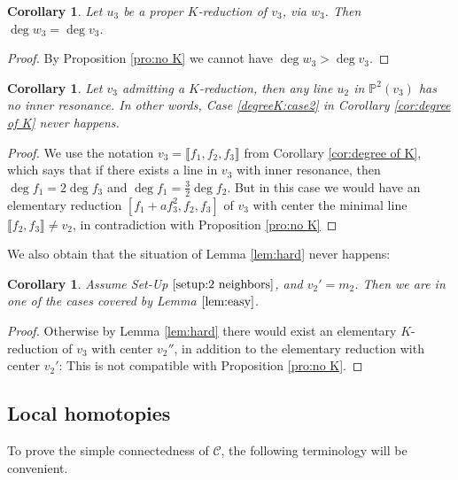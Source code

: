 \documentclass[reqno,oneside,11pt]{amsart}
\theoremstyle{plain}
\newtheorem{corollary}[theorem]{Corollary}
\theoremstyle{definition}
\newcommand{\p}{\mathbb{P}}
\newcommand{\Comp}{\mathcal{C}}
\newcommand{\llb}{\llbracket}
\newcommand{\rrb}{\rrbracket}
\newcommand{\lines}[1]{\p^2(#1)}
\begin{document}
\begin{corollary} \label{cor:v3 w3 same degree}
Let $u_3$ be a proper $K$-reduction of $v_3$, via $w_3$.
Then $\deg w_3 = \deg v_3$.
\end{corollary}

\begin{proof}
By Proposition \ref{pro:no K} we cannot have $\deg w_3 > \deg v_3$.
\end{proof}

\begin{corollary} \label{cor:no inner resonance}
Let $v_3$ admitting a $K$-reduction, then any line $u_2$ in $\lines{v_3}$ has no inner resonance.
In other words, Case \ref{degreeK:case2} in Corollary \ref{cor:degree of K} never  happens.
\end{corollary}

\begin{proof}
We use the notation $v_3 = \llb f_1, f_2, f_3 \rrb$ from Corollary
\ref{cor:degree of K}, which says that if there exists a line in $v_3$ with
inner resonance, then $\deg f_1 = 2 \deg f_3$ and $\deg f_1 = \frac32 \deg f_2$.
But in this case we would have an elementary
reduction $[f_1 + af_3^2, f_2, f_3]$ of $v_3$ with center the minimal line $\llb f_2, f_3 \rrb
\neq v_2$, in contradiction with Proposition \ref{pro:no K}
\end{proof}

We also obtain that the situation of Lemma \ref{lem:hard} never happens:

\begin{corollary} \label{cor:no hard}
Assume Set-Up $\ref{setup:2 neighbors}$, and $v_2' = m_2$.
Then we are in one of the cases covered by Lemma $\ref{lem:easy}$.
\end{corollary}

\begin{proof}
Otherwise by Lemma \ref{lem:hard} there would exist an elementary $K$-reduction of $v_3$ with center $v_2''$, in addition to the elementary reduction with center $v_2'$: This is not compatible with Proposition \ref{pro:no K}.
\end{proof}

\subsection{Local homotopies}

To prove the simple connectedness of $\Comp$, the following terminology will be
convenient.
\end{document}
